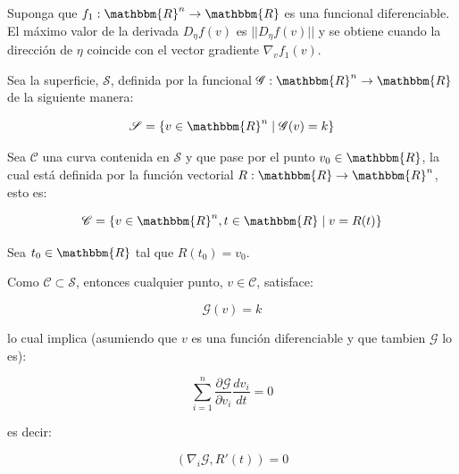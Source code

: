                 \begin{teorema}
                    Suponga que $f_1: \mathbbm{R}^n \to \mathbbm{R}$ es una funcional diferenciable. El máximo valor de la derivada $D_{\eta}f(v)$ es $||D_{\eta}f(v)||$ y se obtiene cuando la dirección de $\eta$ coincide con el vector gradiente $\nabla_v f_1(v)$.
                \end{teorema}

                Sea la superficie, $\mathscr{S}$, definida por la funcional $\mathscr{G}:\mathbbm{R}^n \to \mathbbm{R}$ de la siguiente manera:

                \begin{equation}
                    \mathscr{S} = \left\{ v \in \mathbbm{R}^n \mid \mathscr{G}(v) = k \right\}
                \end{equation}

                Sea $\mathscr{C}$ una curva contenida en $\mathscr{S}$ y que pase por el punto $v_0 \in \mathbbm{R}$, la cual está definida por la función vectorial $R: \mathbbm{R} \to \mathbbm{R}^n$, esto es:

                \begin{equation}
                    \mathscr{C} = \left\{ v \in \mathbbm{R}^n, t \in \mathbbm{R} \mid v = R(t)\right\}
                \end{equation}

                Sea $t_0 \in \mathbbm{R}$ tal que $R(t_0) = v_0$.

                Como $\mathscr{C} \subset \mathscr{S}$, entonces cualquier punto, $v \in \mathscr{C}$, satisface:

                \begin{equation*}
                    \mathscr{G}(v) = k
                \end{equation*}

                lo cual implica (asumiendo que $v$ es una función diferenciable y que tambien $\mathscr{G}$ lo es):

                \begin{equation*}
                    \sum_{i=1}^n \frac{\partial \mathscr{G}}{\partial v_i} \frac{d v_i}{dt} = 0
                \end{equation*}

                es decir:

                \begin{equation*}
                    \left( \nabla_i \mathscr{G}, R'(t) \right) = 0
                \end{equation*}

